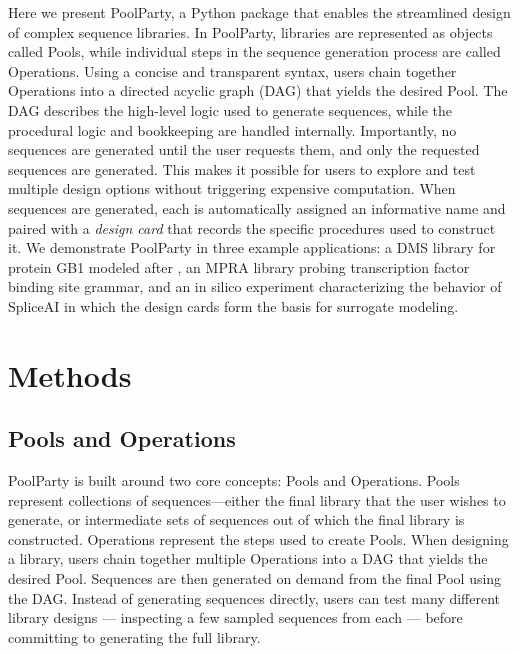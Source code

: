 \documentclass[unnumsec,webpdf,modern,large]{mam-authoring-template}%
\theoremstyle{thmstyleone}%
\theoremstyle{thmstyletwo}%
\theoremstyle{thmstylethree}%
\begin{document}
Here we present PoolParty, a Python package that enables the streamlined design of complex sequence libraries. In PoolParty, libraries are represented as objects called Pools, while individual steps in the sequence generation process are called Operations. Using a concise and transparent syntax, users chain together Operations into a directed acyclic graph (DAG) that yields the desired Pool. The DAG describes the high-level logic used to generate sequences, while the procedural logic and bookkeeping are handled internally. Importantly, no sequences are generated until the user requests them, and only the requested sequences are generated. This makes it possible for users to explore and test multiple design options without triggering expensive computation. When sequences are generated, each is automatically assigned an informative name and paired with a \emph{design card} that records the specific procedures used to construct it. We demonstrate PoolParty in three example applications: a DMS library for protein GB1 modeled after \cite{Olson2014iq}, an MPRA library probing transcription factor binding site grammar, and an in silico experiment characterizing the behavior of SpliceAI \citep{Jaganathan2019ps} in which the design cards form the basis for surrogate modeling.

\section{Methods}

\subsection{Pools and Operations}

PoolParty is built around two core concepts: Pools and Operations. Pools represent collections of sequences---either the final library that the user wishes to generate, or intermediate sets of sequences out of which the final library is constructed. Operations represent the steps used to create Pools. When designing a library, users chain together multiple Operations into a DAG that yields the desired Pool. Sequences are then generated on demand from the final Pool using the DAG. Instead of generating sequences directly, users can test many different library designs --- inspecting a few sampled sequences from each --- before committing to generating the full library.  
\end{document}

